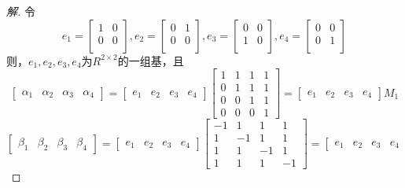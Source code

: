 \documentclass[10pt,a4paper]{report}
\begin{document}
\begin{proof}[解]
	令
	$$e_{1} = \left[
	\begin{matrix}
	1 & 0\\
	0 & 0\\
	\end{matrix}
	\right],e_{2} = \left[
	\begin{matrix}
	0 & 1\\
	0 & 0\\
	\end{matrix}
	\right],e_{3} = \left[
	\begin{matrix}
	0 & 0\\
	1 & 0\\
	\end{matrix}
	\right], e_{4} = \left[
	\begin{matrix}
	0 & 0\\
	0 & 1\\
	\end{matrix}
	\right]$$
	则，$e_{1},e_{2},e_{3},e_{4}$为$R^{2\times 2}$的一组基，且
	$$
	\left[
	\begin{matrix}
	\alpha_{1} & \alpha_{2} & \alpha_{3} & \alpha_{4}
	\end{matrix}
	\right] = \left[
	\begin{matrix}
	e_{1} & e_{2} & e_{3} & e_{4}
	\end{matrix}
	\right]\left[
	\begin{matrix}
	1 & 1 & 1 & 1\\
	0 & 1 & 1 & 1\\
	0 & 0 & 1 & 1\\
	0 & 0 & 0 & 1
	\end{matrix}
	\right] = \left[
	\begin{matrix}
	e_{1} & e_{2} & e_{3} & e_{4}
	\end{matrix}
	\right]M_{1}
	$$
	$$
	\left[
	\begin{matrix}
	\beta_{1} & \beta_{2} & \beta_{3} & \beta_{4}
	\end{matrix}
	\right] = \left[
	\begin{matrix}
	e_{1} & e_{2} & e_{3} & e_{4}
	\end{matrix}
	\right]\left[
	\begin{matrix}
	-1 & 1 & 1 & 1\\
	1 & -1 & 1 & 1\\
	1 & 1 & -1 & 1\\
	1 & 1 & 1 & -1
	\end{matrix}
	\right] = \left[
	\begin{matrix}
	e_{1} & e_{2} & e_{3} & e_{4}

\end{matrix}$$
\end{proof}
\end{document}
